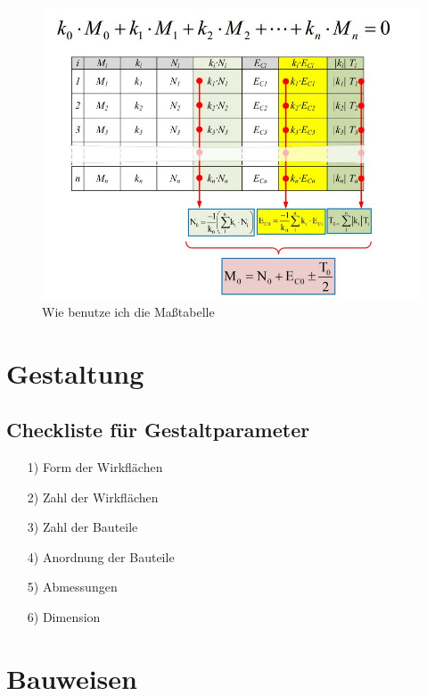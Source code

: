 \begin{figure}[h]
	\centering
	\includegraphics[scale=0.7]{Masstabelle.jpg}
	\caption{Wie benutze ich die Maßtabelle}
\end{figure}


\section{Gestaltung}


\subsection*{Checkliste für Gestaltparameter}

\begin{itemize}
	\item[1)] Form der Wirkflächen
	\item[2)] Zahl der Wirkflächen
	\item[3)] Zahl der Bauteile
	\item[4)] Anordnung der Bauteile
	\item[5)] Abmessungen	
	\item[6)] Dimension
\end{itemize}


\newpage

\section{Bauweisen}


